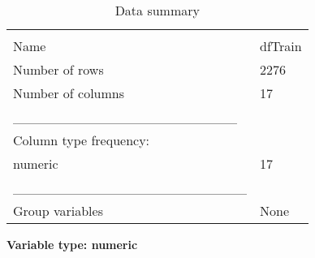 \documentclass[
]{article}
\begin{document}
\begin{longtable}[]{@{}ll@{}}
\caption{Data summary}\tabularnewline
\toprule
& \\
\midrule
\endfirsthead
\toprule
& \\
\midrule
\endhead
Name & dfTrain \\
Number of rows & 2276 \\
Number of columns & 17 \\
\_\_\_\_\_\_\_\_\_\_\_\_\_\_\_\_\_\_\_\_\_\_\_ & \\
Column type frequency: & \\
numeric & 17 \\
\_\_\_\_\_\_\_\_\_\_\_\_\_\_\_\_\_\_\_\_\_\_\_\_ & \\
Group variables & None \\
\bottomrule
\end{longtable}

\textbf{Variable type: numeric}
\end{document}
